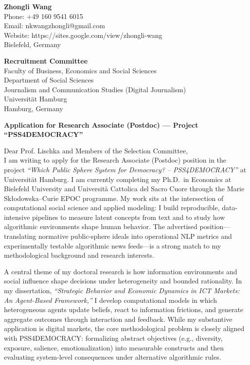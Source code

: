 \documentclass[11pt]{article}
\begin{document}
\noindent
\textbf{Zhongli Wang} \\
Phone: +49 160 9541 6015 \\
Email: nkwangzhongli@gmail.com \\
Website: https://sites.google.com/view/zhongli-wang \\
Bielefeld, Germany \\

\vspace{0.5cm}

\noindent
\textbf{Recruitment Committee} \\
Faculty of Business, Economics and Social Sciences \\
Department of Social Sciences \\
Journalism and Communication Studies (Digital Journalism) \\
Universit\"at Hamburg \\
Hamburg, Germany \\

\vspace{0.5cm}

\noindent
\textbf{Application for Research Associate (Postdoc) --- Project ``PSS4DEMOCRACY''} \\

\vspace{0.3cm}

\noindent Dear Prof. Lischka and Members of the Selection Committee,\\[0.2cm]

I am writing to apply for the Research Associate (Postdoc) position in the project \textit{``Which Public Sphere System for Democracy? -- PSS4DEMOCRACY''} at Universit\"at Hamburg. I am currently completing my Ph.D.\ in Economics at Bielefeld University and Universit\`a Cattolica del Sacro Cuore through the Marie Sk{\l}odowska--Curie EPOC programme. My work sits at the intersection of computational social science and applied modeling: I build reproducible, data-intensive pipelines to measure latent concepts from text and to study how algorithmic environments shape human behavior. The advertised position---translating normative public-sphere ideals into operational NLP metrics and experimentally testable algorithmic news feeds---is a strong match to my methodological background and research interests.

A central theme of my doctoral research is how information environments and social influence shape decisions under heterogeneity and bounded rationality. In my dissertation, \textit{``Strategic Behavior and Economic Dynamics in ICT Markets: An Agent-Based Framework,''} I develop computational models in which heterogeneous agents update beliefs, react to information frictions, and generate aggregate outcomes through interaction and feedback. While my substantive application is digital markets, the core methodological problem is closely aligned with PSS4DEMOCRACY: formalizing abstract objectives (e.g., diversity, exposure, salience, emotionalization) into measurable constructs and then evaluating system-level consequences under alternative algorithmic rules.
\end{document}
